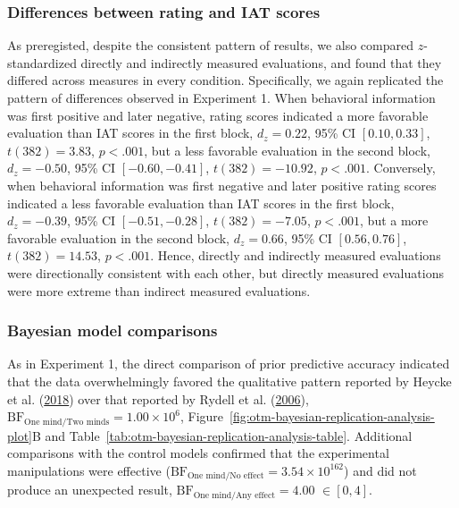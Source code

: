 \documentclass[
  man,floatsintext]{apa6}
\begin{document}
\hypertarget{differences-between-rating-and-iat-scores-1}{%
\subsubsection{Differences between rating and IAT scores}\label{differences-between-rating-and-iat-scores-1}}

As preregisted, despite the consistent pattern of results, we also compared \(z\)-standardized directly and indirectly measured evaluations, and found that they differed across measures in every condition.
Specifically, we again replicated the pattern of differences observed in Experiment 1.
When behavioral information was first positive and later negative, rating scores indicated a more favorable evaluation than IAT scores in the first block, \(d_z = 0.22\), 95\% CI \([0.10, 0.33]\), \(t(382) = 3.83\), \(p < .001\), but a less favorable evaluation in the second block, \(d_z = -0.50\), 95\% CI \([-0.60, -0.41]\), \(t(382) = -10.92\), \(p < .001\).
Conversely, when behavioral information was first negative and later positive rating scores indicated a less favorable evaluation than IAT scores in the first block, \(d_z = -0.39\), 95\% CI \([-0.51, -0.28]\), \(t(382) = -7.05\), \(p < .001\), but a more favorable evaluation in the second block, \(d_z = 0.66\), 95\% CI \([0.56, 0.76]\), \(t(382) = 14.53\), \(p < .001\).
Hence, directly and indirectly measured evaluations were directionally consistent with each other, but directly measured evaluations were more extreme than indirect measured evaluations.

\hypertarget{replicability-assessment2}{%
\subsubsection{Bayesian model comparisons}\label{replicability-assessment2}}

As in Experiment 1, the direct comparison of prior predictive accuracy indicated that the data overwhelmingly favored the qualitative pattern reported by Heycke et al. (\protect\hyperlink{ref-heycke_two_2018}{2018}) over that reported by Rydell et al. (\protect\hyperlink{ref-rydell_two_2006}{2006}), \(\mathrm{BF}_{\textrm{One mind}/\textrm{Two minds}} = 1.00 \times 10^{6}\), Figure~\ref{fig:otm-bayesian-replication-analysis-plot}B and Table~\ref{tab:otm-bayesian-replication-analysis-table}.
Additional comparisons with the control models confirmed that the experimental manipulations were effective (\(\mathrm{BF}_{\textrm{One mind}/\textrm{No effect}} = 3.54 \times 10^{162}\)) and did not produce an unexpected result, \(\mathrm{BF}_{\textrm{One mind}/\textrm{Any effect}} = 4.00\) \(\in [0, 4]\).
\end{document}
